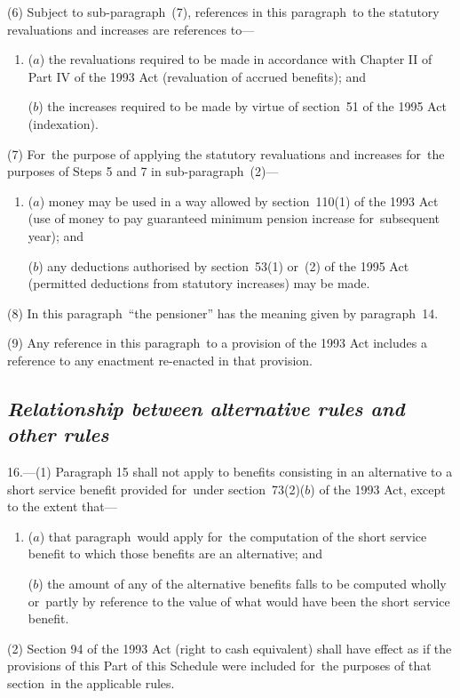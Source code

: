 \documentclass[12pt,a4paper]{article}
\begin{document}
(6) Subject to sub-paragraph~(7), references in this paragraph~to the statutory revaluations and increases are references to—
\begin{enumerate}\item[]
($a$) the revaluations required to be made in accordance with Chapter II of Part IV of the 1993 Act (revaluation of accrued benefits); and

($b$) the increases required to be made by virtue of section~51 of the 1995 Act (indexation).
\end{enumerate}

(7) For~the purpose of applying the statutory revaluations and increases for~the purposes of Steps 5 and 7 in sub-paragraph~(2)—
\begin{enumerate}\item[]
($a$) money may be used in a way allowed by section~110(1)  of the 1993 Act (use of money to pay guaranteed minimum pension increase for~subsequent year); and

($b$) any deductions authorised by section~53(1)  or~(2)  of the 1995 Act (permitted deductions from statutory increases) may be made.
\end{enumerate}

(8) In this paragraph~“the pensioner” has the meaning given by paragraph~14. 

(9) Any reference in this paragraph~to a provision of the 1993 Act includes a reference to any enactment re-enacted in that provision.

\subsection*{\itshape Relationship between alternative rules and other rules}

16.---(1) Paragraph 15 shall not apply to benefits consisting in an alternative to a short service benefit provided for~under section~73(2)($b$)  of the 1993 Act, except to the extent that—
\begin{enumerate}\item[]
($a$) that paragraph~would apply for~the computation of the short service benefit to which those benefits are an alternative; and

($b$) the amount of any of the alternative benefits falls to be computed wholly or~partly by reference to the value of what would have been the short service benefit.
\end{enumerate}

(2) Section 94 of the 1993 Act (right to cash equivalent) shall have effect as if the provisions of this Part of this Schedule were included for~the purposes of that section~in the applicable rules.
\end{document}
